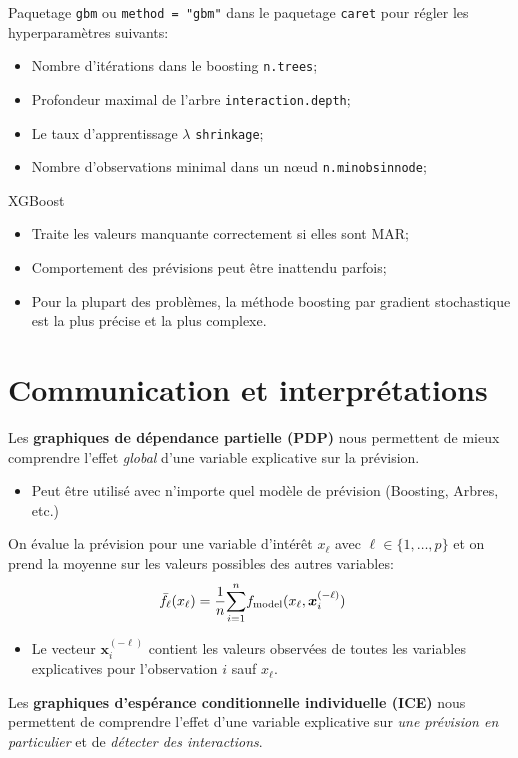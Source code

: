 \documentclass[10pt, french]{article}
\begin{document}
\begin{multicols*}{3}
\begin{definitionNOHFILLsub}
Paquetage \texttt{gbm} ou \texttt{method = "gbm"} dans le paquetage \texttt{caret} pour régler les hyperparamètres suivants:
\begin{itemize}[leftmargin = *]
	\item	Nombre d'itérations dans le boosting \texttt{n.trees};
	\item	Profondeur maximal de l'arbre \texttt{interaction.depth};
	\item	Le taux d'apprentissage $\lambda$ \texttt{shrinkage};
	\item	Nombre d'observations minimal dans un nœud \texttt{n.minobsinnode};
\end{itemize}
\end{definitionNOHFILLsub}

XGBoost
\begin{itemize}
	\item	Traite les valeurs manquante correctement si elles sont MAR;
	\item	Comportement des prévisions peut être inattendu parfois;
	\item	Pour la plupart des problèmes, la méthode boosting par gradient stochastique est la plus précise et la plus complexe.
\end{itemize}


\section{Communication et interprétations}
Les \textbf{graphiques de dépendance partielle (PDP)} nous permettent de mieux comprendre l'effet \textit{global} d'une variable explicative sur la prévision.
\begin{itemize}[leftmargin = *]
	\item	Peut être utilisé avec n'importe quel modèle de prévision (Boosting, Arbres, etc.)
\end{itemize}

On évalue la prévision pour une variable d'intérêt $x_{\ell}$ avec $\ell \in \{1, \dots, p\}$ et on prend la moyenne sur les valeurs possibles des autres variables:
\begin{align*}
	\bar{f}_{\ell}(x_{\ell})
	&=	\frac{1}{n} \overset{n}{\underset{i = 1}{\sum}} f_{\text{model}}(x_{\ell}, 	\bm{x}_{i}^{(-\ell)})
\end{align*}
\begin{itemize}[leftmargin = *]
	\item	Le vecteur $\bm{x}_{i}^{(-\ell)}$ contient les valeurs observées de toutes les variables explicatives pour l'observation $i$ sauf $x_{\ell}$.
\end{itemize}

Les \textbf{graphiques d'espérance conditionnelle individuelle (ICE)} nous permettent de comprendre l'effet d'une variable explicative sur \textit{une prévision en particulier} et de \textit{détecter des interactions}.

\end{multicols*}
\end{document}
